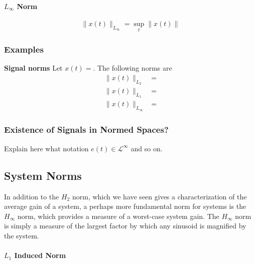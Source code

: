 \paragraph{$L_{\infty}$ Norm}
\begin{equation*}
  \|x(t)\|_{L_{\infty}}=\sup_{t}\|x(t)\|
\end{equation*}

\subsubsection{Examples}

\begin{example}
\textbf{Signal norms}
Let $x(t)=$.
The following norms are
\begin{equation*}
\begin{split}
\|x(t)\|_{L_{2}}&= \\
\|x(t)\|_{L_{1}}&= \\
\|x(t)\|_{L_{\infty}}&=
\end{split}
\end{equation*}
\end{example}

\subsubsection{Existence of Signals in Normed Spaces?}

Explain here what notation $e(t)\in\mathcal{L}^{\infty}$ and so on.

\subsection{System Norms}

In addition to the $H_{2}$ norm, which we have seen gives a characterization of the average gain of a system, a perhaps more fundamental norm for systems is the $H_{\infty}$ norm, which provides a measure of a worst-case system gain.
The $H_{\infty}$ norm is simply a measure of the largest factor by which any sinusoid is magnified by the system.

\paragraph{$L_{1}$ Induced Norm}

